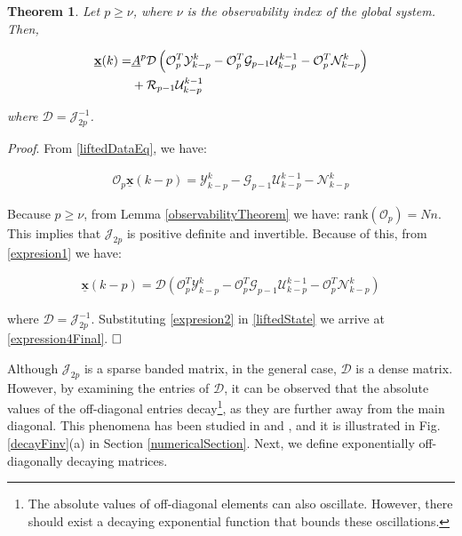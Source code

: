 \documentclass[journal,10pt]{IEEEtran}
\newtheorem{thm}{Theorem}[section]
\begin{document}
\begin{thm}
Let $p\ge \nu$, where $\nu$ is the observability index of the global system. Then,
\begin{small} 
\begin{align}
  \underline{\mathbf{x}}(k)=&\underline{A}^{p}\mathcal{D}\left(\mathcal{O}_{p}^{T}\mathcal{Y}_{k-p}^{k}-\mathcal{O}_{p}^{T}\mathcal{G}_{p-1}\mathcal{U}_{k-p}^{k-1}-\mathcal{O}_{p}^{T}\mathcal{N}_{k-p}^{k}\right)\notag \\&+\mathcal{R}_{p-1}\mathcal{U}_{k-p}^{k-1}
\label{expression4Final}
\end{align}
\end{small}
\label{stateEstimatorLemma}
where $\mathcal{D}=\mathcal{J}_{2p}^{-1}$.
\end{thm}
\textit{Proof}. From \eqref{liftedDataEq}, we have:
\begin{small}
\begin{align} 
\mathcal{O}_{p}\underline{\mathbf{x}}(k-p)=\mathcal{Y}_{k-p}^{k}-\mathcal{G}_{p-1}\mathcal{U}_{k-p}^{k-1}-\mathcal{N}_{k-p}^{k}
\label{expresion1}
\end{align}
\end{small}
Because $p\ge \nu$, from Lemma \ref{observabilityTheorem} we have: $\text{rank}(\mathcal{O}_{p})=Nn$. This implies that $\mathcal{J}_{2p}$ is positive definite and invertible. Because of this, from \eqref{expresion1} we have:
\begin{small}
\begin{align} 
\underline{\mathbf{x}}(k-p)=\mathcal{D}\left(\mathcal{O}_{p}^{T}\mathcal{Y}_{k-p}^{k}-\mathcal{O}_{p}^{T}\mathcal{G}_{p-1}\mathcal{U}_{k-p}^{k-1}-\mathcal{O}_{p}^{T}\mathcal{N}_{k-p}^{k}\right)
\label{expresion2}
\end{align}
\end{small}
where $\mathcal{D}=\mathcal{J}_{2p}^{-1}$. Substituting \eqref{expresion2} in  \eqref{liftedState} we arrive at \eqref{expression4Final}. $\hfill \square$
\par
 Although $\mathcal{J}_{2p}$ is a sparse banded matrix, in the general case, $\mathcal{D}$ is a dense matrix. However, by examining the entries of $\mathcal{D}$, it can be observed that the absolute values of the off-diagonal entries decay\footnote{The absolute values of off-diagonal elements can also oscillate. However, there should exist a decaying exponential function that bounds these oscillations.}, as they are further away from the main diagonal. This phenomena has been studied in \cite{benzi2007} and \cite{demko1984}, and it is illustrated in Fig. \ref{decayFinv}(a) in Section \ref{numericalSection}. Next, we define exponentially off-diagonally decaying matrices. \\
\end{document}
